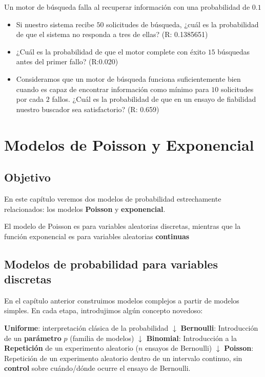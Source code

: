 \documentclass[
]{book}
\begin{document}
Un motor de búsqueda falla al recuperar información con una probabilidad de \(0.1\)

\begin{itemize}
\item
  Si nuestro sistema recibe \(50\) solicitudes de búsqueda, ¿cuál es la probabilidad de que el sistema no responda a tres de ellas? (R: 0.1385651)
\item
  ¿Cuál es la probabilidad de que el motor complete con éxito \(15\) búsquedas antes del primer fallo? (R:0.020)
\item
  Consideramos que un motor de búsqueda funciona suficientemente bien cuando es capaz de encontrar información como mínimo para \(10\) solicitudes por cada \(2\) fallos. ¿Cuál es la probabilidad de que en un ensayo de fiabilidad nuestro buscador sea satisfactorio? (R: 0.659)
\end{itemize}

\hypertarget{modelos-de-poisson-y-exponencial}{%
\chapter{Modelos de Poisson y Exponencial}\label{modelos-de-poisson-y-exponencial}}

\hypertarget{objetivo-4}{%
\section{Objetivo}\label{objetivo-4}}

En este capítulo veremos dos modelos de probabilidad estrechamente relacionados: los modelos \textbf{Poisson} y \textbf{exponencial}.

El modelo de Poisson es para variables aleatorias discretas, mientras que la función exponencial es para variables aleatorias \textbf{continuas}

\hypertarget{modelos-de-probabilidad-para-variables-discretas}{%
\section{Modelos de probabilidad para variables discretas}\label{modelos-de-probabilidad-para-variables-discretas}}

En el capítulo anterior construimos modelos complejos a partir de modelos simples. En cada etapa, introdujimos algún concepto novedoso:

\textbf{Uniforme}: interpretación clásica de la probabilidad
\(\downarrow\)
\textbf{Bernoulli}: Introducción de un \textbf{parámetro} \(p\) (familia de modelos)
\(\downarrow\)
\textbf{Binomial}: Introducción a la \textbf{Repetición} de un experimento aleatorio (\(n\) ensayos de Bernoulli)
\(\downarrow\)
\textbf{Poisson}: Repetición de un experimento aleatorio dentro de un intervalo continuo, sin \textbf{control} sobre cuándo/dónde ocurre el ensayo de Bernoulli.
\end{document}
